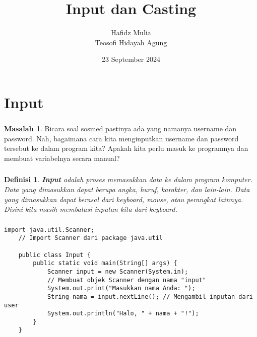 \documentclass[aspectratio=169]{beamer}
\author[Tew \& Haf]{Hafidz Mulia\\Teosofi Hidayah Agung}
\date{23 September 2024}
\title[Alpro 1 - Week 3]{Input dan Casting}
\institute[Matematika ITS]{Departemen Matematika\\ Institut Teknologi Sepuluh Nopember}
\newtheorem*{definisi}{Definisi}
\theoremstyle{definition}
\newtheorem*{masalah}{Masalah}
\begin{document}
    {
    \begin{frame}
        \titlepage
    \end{frame}
    }


    \section{Input}
    \begin{frame}
        \frametitle{\insertsection}
        \begin{masalah}
            Bicara soal sosmed pastinya ada yang namanya username dan password. Nah, bagaimana cara kita menginputkan username dan password tersebut ke dalam program kita? Apakah kita perlu masuk ke programnya dan membuat variabelnya secara manual?
        \end{masalah}
    \end{frame}
    
    \begin{frame}
        \frametitle{\insertsection}
        \begin{definisi}
            \textbf{Input} adalah proses memasukkan data ke dalam program komputer. Data yang dimasukkan dapat berupa angka, huruf, karakter, dan lain-lain. Data yang dimasukkan dapat berasal dari keyboard, mouse, atau perangkat lainnya. Disini kita masih membatasi inputan kita dari keyboard.
        \end{definisi}
    \end{frame}

    \begin{frame}[fragile]
        \frametitle{\insertsection}
        \begin{lstlisting}[caption={Contoh penggunaan Scanner}]
    import java.util.Scanner; 
    // Import Scanner dari package java.util

    public class Input {
        public static void main(String[] args) {
            Scanner input = new Scanner(System.in); 
            // Membuat objek Scanner dengan nama "input"
            System.out.print("Masukkan nama Anda: ");
            String nama = input.nextLine(); // Mengambil inputan dari user
            System.out.println("Halo, " + nama + "!");
        }
    }
        \end{lstlisting}
    \end{frame}
\end{document}
